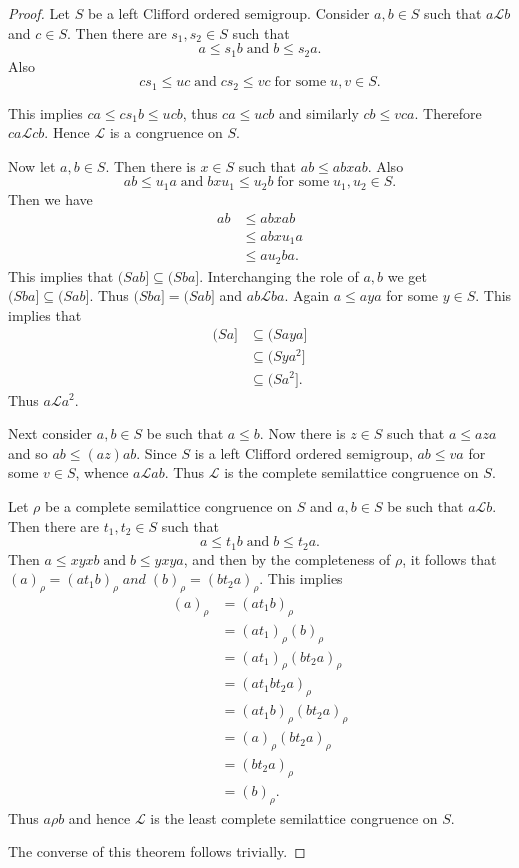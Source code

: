 \documentclass[13pt]{article}
\theoremstyle{definition}
\theoremstyle{remark}
\numberwithin{equation}{section}
\newcommand{\lc}{\mathcal{L}}
\begin{document}
\begin{proof}
Let $S$ be a  left Clifford ordered semigroup. Consider $a, b \in S$
such that $a \lc b$ and $c \in S$. Then  there are $s_1, s_2 \in S$
such that $$a \leq s_1b \;\textrm{and} \;b \leq s_2a.$$ Also $$cs_1
\leq uc \;\textrm{and} \;cs_2 \leq vc \;\textrm{for some} \;u, v \in
S.$$

This implies $ca \leq cs_1b \leq ucb$, thus  $ca \leq ucb $ and
similarly $cb \leq vca$. Therefore $ca \lc cb$. Hence $\lc$ is a
congruence on $S$.

Now let $a, b \in S$. Then there is $x \in S$ such that $ab \leq ab
x ab$. Also
$$ab \leq u_1a \;\textrm{and} \;bxu_1 \leq u_2b \;\textrm{for some} \;u_1, u_2 \in S.$$ Then we
have
\begin{align*}
ab &\leq ab x ab\\
   & \leq ab x u_1a\\
   & \leq au_2ba.
\end{align*}
This implies that $(Sab] \subseteq (Sba]$. Interchanging the role of
$a, b $ we get $(Sba] \subseteq (Sab]$. Thus $(Sba] = (Sab]$ and $ab
\lc ba$. Again $a \leq aya $ for some $y \in S$. This implies that
\begin{align*}
(Sa] &\subseteq (Saya]\\
     & \subseteq (Sya^2]\\
     & \subseteq (Sa^2].
\end{align*}
Thus $a\lc a^2$.

Next  consider $a, b \in S$ be such that $a \leq b$. Now there is $z
\in S$ such that  $a \leq aza $ and so $ab \leq (az)ab$. Since $S$
is a left Clifford ordered semigroup, $ab \leq va$ for some $v \in
S$, whence $a \lc ab$. Thus $\lc$ is the complete semilattice
congruence on $S$.

Let $\rho$ be a complete semilattice congruence on $S$ and $a,b \in
S$ be such that $a \lc b$. Then there are $t_1, t_2 \in S$ such that
$$a \leq t_1b \;\textrm{and} \;b \leq t_2a.$$
Then $a \leq xyxb \;\textrm{and} \;b \leq yxya$,  and then by the
completeness of $\rho$, it follows that $(a)_\rho= (at_1b)_\rho
\;and \; (b)_\rho= (bt_2a)_\rho$. This implies
\begin{align*}
(a)_\rho &= (at_1b)_\rho\\
         &= (at_1)_\rho (b)_\rho\\
         &= (at_1)_\rho (bt_2a)_\rho\\
         &= (at_1bt_2a)_\rho\\
         &= (at_1b)_\rho (bt_2a)_\rho\\
         &= (a)_\rho (bt_2a)_\rho\\
         &= (bt_2a)_\rho\\
         &= (b)_\rho.
\end{align*}  Thus $a \rho b$ and hence $\lc$ is the least complete semilattice congruence on
$S$.

The converse of this theorem follows trivially.
\end{proof}
\end{document}
